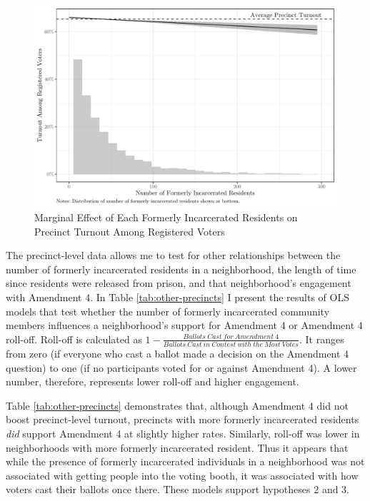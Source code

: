 \documentclass[
  12pt,
]{article}
\begin{document}
\begin{figure}[H]

{\centering \includegraphics{amendment_4_turnout_files/figure-latex/marg1-1} 

}

\caption{\label{fig:marg1}Marginal Effect of Each Formerly Incarcerated Residents on Precinct Turnout Among Registered Voters}\label{fig:marg1}
\end{figure}

The precinct-level data allows me to test for other relationships between the number of formerly incarcerated residents in a neighborhood, the length of time since residents were released from prison, and that neighborhood's engagement with Amendment 4. In Table \ref{tab:other-precincts} I present the results of OLS models that test whether the number of formerly incarcerated community members influences a neighborhood's support for Amendment 4 or Amendment 4 roll-off. Roll-off is calculated as \(1 - \frac{Ballots\:Cast\:for\:Amendment\:4}{Ballots\:Cast\:in\:Contest\:with\:the\:Most\:Votes}\). It ranges from zero (if everyone who cast a ballot made a decision on the Amendment 4 question) to one (if no participants voted for or against Amendment 4). A lower number, therefore, represents lower roll-off and higher engagement.

\begin{singlespace}


\end{singlespace}

Table \ref{tab:other-precincts} demonstrates that, although Amendment 4 did not boost precinct-level turnout, precincts with more formerly incarcerated residents \emph{did} support Amendment 4 at slightly higher rates. Similarly, roll-off was lower in neighborhoods with more formerly incarcerated resident. Thus it appears that while the presence of formerly incarcerated individuals in a neighborhood was not associated with getting people into the voting booth, it was associated with how voters cast their ballots once there. These models support hypotheses 2 and 3.
\end{document}
